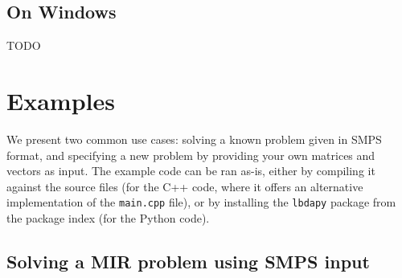 \documentclass[12pt, english]{article}
\begin{document}
\subsection{On Windows}

TODO

\section{Examples}
\label{sec:examples}

We present two common use cases: solving a known problem given in SMPS format, and specifying a new problem by providing your own matrices and vectors as input. The example code can be ran as-is, either by compiling it against the source files (for the C++ code, where it offers an alternative implementation of the \texttt{main.cpp} file), or by installing the \texttt{lbdapy} package from the package index (for the Python code).

\subsection{Solving a MIR problem using SMPS input}
\label{subsec:solving_smps_example}
\end{document}

